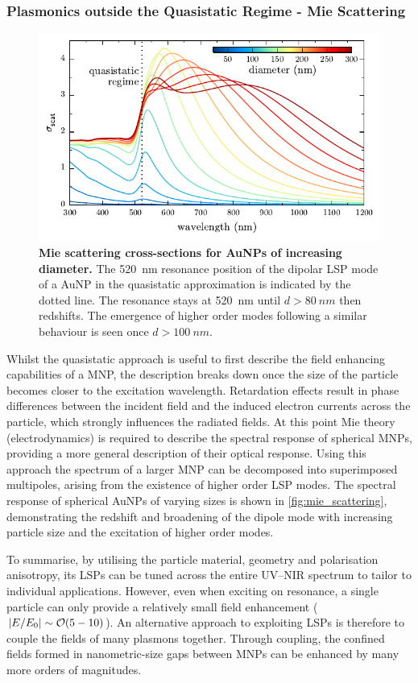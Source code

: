\documentclass{article}
\begin{document}
\subsubsection{Plasmonics outside the Quasistatic Regime - Mie Scattering}

\begin{figure}[bt]
\centering
\includegraphics{figures/mie_scattering}
\caption[Mie scattering cross-sections for AuNPs of increasing diameter]{\textbf{Mie scattering cross-sections for AuNPs of increasing diameter.} The \SI{520}{nm} resonance position of the dipolar LSP mode of a AuNP in the quasistatic approximation is indicated by the dotted line. The resonance stays at \SI{520}{nm} until $d>\SI{80}{nm}$ then redshifts. The emergence of higher order modes following a similar behaviour is seen once $d>\SI{100}{nm}$.}
\label{fig:mie_scattering}
\end{figure}

Whilst the quasistatic approach is useful to first describe the field enhancing capabilities of a MNP, the description breaks down once the size of the particle becomes closer to the excitation wavelength. Retardation effects result in phase differences between the incident field and the induced electron currents across the particle, which strongly influences the radiated fields. At this point Mie theory (electrodynamics) \cite{mie1908} is required to describe the spectral response of spherical MNPs, providing a more general description of their optical response. Using this approach the spectrum of a larger MNP can be decomposed into superimposed multipoles, arising from the existence of higher order LSP modes. The spectral response of spherical AuNPs of varying sizes is shown in \autoref{fig:mie_scattering}, demonstrating the redshift and broadening of the dipole mode with increasing particle size and the excitation of higher order modes.

To summarise, by utilising the particle material, geometry and polarisation anisotropy, its LSPs can be tuned across the entire UV--NIR spectrum to tailor to individual applications. However, even when exciting on resonance, a single particle can only provide a relatively small field enhancement ($\left|E/E_0\right|\sim\mathcal{O}({5-10})$). An alternative approach to exploiting LSPs is therefore to couple the fields of many plasmons together. Through coupling, the confined fields formed in nanometric-size gaps between MNPs can be enhanced by many more orders of magnitudes.
\end{document}

